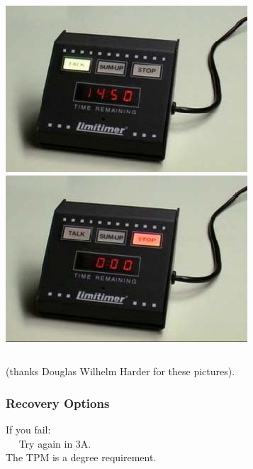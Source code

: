 \documentclass{beamer}
\begin{document}
\begin{frame}
\begin{columns}[c]
\includegraphics[width=.9\columnwidth]{during}\\
\includegraphics[width=.9\columnwidth]{stop}\\
\end{columns}
(thanks Douglas Wilhelm Harder for these pictures).

\end{frame}

\begin{frame}

\frametitle{Recovery Options}

If you fail: \\
$\quad$ Try again in 3A.\\[2em]

The TPM is a degree requirement.

\end{frame}
\end{document}
